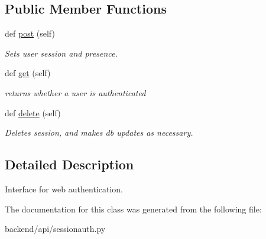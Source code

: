 \subsection*{Public Member Functions}
\begin{DoxyCompactItemize}
\item 
\hypertarget{classbackend_1_1api_1_1sessionauth_1_1_session_auth_a_p_i_a347b5fa2b3f25d909d9ce0f13a1c6de0}{}def \hyperlink{classbackend_1_1api_1_1sessionauth_1_1_session_auth_a_p_i_a347b5fa2b3f25d909d9ce0f13a1c6de0}{post} (self)\label{classbackend_1_1api_1_1sessionauth_1_1_session_auth_a_p_i_a347b5fa2b3f25d909d9ce0f13a1c6de0}

\begin{DoxyCompactList}\small\item\em Sets user session and presence. \end{DoxyCompactList}\item 
\hypertarget{classbackend_1_1api_1_1sessionauth_1_1_session_auth_a_p_i_ac766e479e61ef90d00065ee57ecfc8ba}{}def \hyperlink{classbackend_1_1api_1_1sessionauth_1_1_session_auth_a_p_i_ac766e479e61ef90d00065ee57ecfc8ba}{get} (self)\label{classbackend_1_1api_1_1sessionauth_1_1_session_auth_a_p_i_ac766e479e61ef90d00065ee57ecfc8ba}

\begin{DoxyCompactList}\small\item\em returns whether a user is authenticated \end{DoxyCompactList}\item 
\hypertarget{classbackend_1_1api_1_1sessionauth_1_1_session_auth_a_p_i_a558921f9a89328b2e2b2d066146e808b}{}def \hyperlink{classbackend_1_1api_1_1sessionauth_1_1_session_auth_a_p_i_a558921f9a89328b2e2b2d066146e808b}{delete} (self)\label{classbackend_1_1api_1_1sessionauth_1_1_session_auth_a_p_i_a558921f9a89328b2e2b2d066146e808b}

\begin{DoxyCompactList}\small\item\em Deletes session, and makes db updates as necessary. \end{DoxyCompactList}\end{DoxyCompactItemize}


\subsection{Detailed Description}
Interface for web authentication. 

The documentation for this class was generated from the following file\+:\begin{DoxyCompactItemize}
\item 
backend/api/sessionauth.\+py\end{DoxyCompactItemize}
